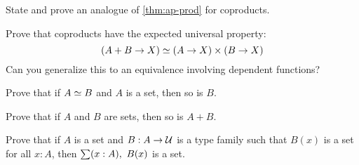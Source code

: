 \begin{ex}
  State and prove an analogue of \autoref{thm:ap-prod} for coproducts.
\end{ex}

\begin{ex}
  Prove that coproducts have the expected universal property:
  \[ (A+B \to X) \simeq (A\to X)\times (B\to X) \]
  Can you generalize this to an equivalence involving dependent functions?
\end{ex}

\begin{ex}
  Prove that if $A \simeq B$ and $A$ is a set, then so is $B$.
\end{ex}

\begin{ex}\label{ex:isset-coprod}
  Prove that if $A$ and $B$ are sets, then so is $A+B$.
\end{ex}

\begin{ex}\label{ex:isset-sigma}
  Prove that if $A$ is a set and $B:A\to \mathcal{U}$ is a type family such that $B(x)$ is a set for all $x:A$, then $\sm{x:A} B(x)$ is a set.
\end{ex}

